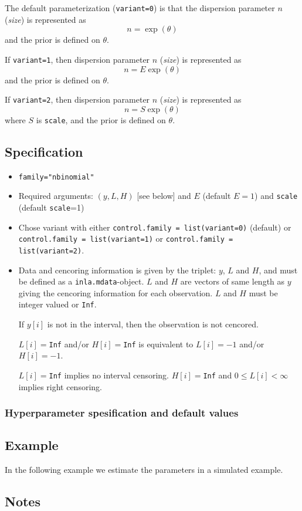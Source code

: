 \documentclass[a4paper,11pt]{article}
\begin{document}
The default parameterization (\verb|variant=0|) is that the dispersion
parameter $n$ (\emph{size}) is represented as
\begin{displaymath}
    n = \exp(\theta)
\end{displaymath}
and the prior is defined on $\theta$.

If \verb|variant=1|, then dispersion parameter $n$ (\emph{size}) is
represented as
\begin{displaymath}
    n = E\exp(\theta)
\end{displaymath}
and the prior is defined on $\theta$.

If \verb|variant=2|, then dispersion parameter $n$ (\emph{size}) is
represented as
\begin{displaymath}
    n = S\exp(\theta)
\end{displaymath}
where $S$ is \texttt{scale}, and the prior is defined on $\theta$.

\subsection*{Specification}

\begin{itemize}
\item \texttt{family="nbinomial"}
\item Required arguments: $(y,L,H)$ [see below] and $E$ (default
    $E=1$) and \texttt{scale} (default \texttt{scale}=1)
\item Chose variant with either
    \verb|control.family = list(variant=0)| (default) or\\
    \verb|control.family = list(variant=1)| or
    \verb|control.family = list(variant=2)|.
\item Data and cencoring information is given by the triplet: $y$, $L$
    and $H$, and must be defined as a \texttt{inla.mdata}-object. $L$
    and $H$ are vectors of same length as $y$ giving the cencoring
    information for each observation. $L$ and $H$ must be integer
    valued or \texttt{Inf}.

    If $y[i]$ is not in the interval, then the observation is not
    cencored.

    $L[i]=$\texttt{Inf} and/or $H[i]=$\texttt{Inf} is equivalent to
    $L[i]= -1$ and/or $H[i] = -1$.

    $L[i]=$\texttt{Inf} implies no interval censoring.
    $H[i]=$\texttt{Inf} and $0\leq L[i]<\infty$ implies right
    censoring.

\end{itemize}
    

\subsubsection*{Hyperparameter spesification and default values}



\subsection*{Example}

In the following example we estimate the parameters in a simulated
example. {\small  }

\subsection*{Notes}
\end{document}
